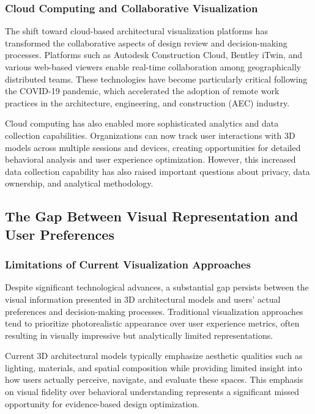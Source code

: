 \documentclass[12pt,a4paper]{book}
\begin{document}
\subsubsection{Cloud Computing and Collaborative Visualization}
\label{subsubsec:cloud_collaborative}

The shift toward cloud-based architectural visualization platforms has transformed the collaborative aspects of design review and decision-making processes. Platforms such as Autodesk Construction Cloud, Bentley iTwin, and various web-based viewers enable real-time collaboration among geographically distributed teams. These technologies have become particularly critical following the COVID-19 pandemic, which accelerated the adoption of remote work practices in the architecture, engineering, and construction (AEC) industry.

Cloud computing has also enabled more sophisticated analytics and data collection capabilities. Organizations can now track user interactions with 3D models across multiple sessions and devices, creating opportunities for detailed behavioral analysis and user experience optimization. However, this increased data collection capability has also raised important questions about privacy, data ownership, and analytical methodology.

\subsection{The Gap Between Visual Representation and User Preferences}
\label{subsec:gap_visual_preferences}

\subsubsection{Limitations of Current Visualization Approaches}
\label{subsubsec:visualization_limitations}

Despite significant technological advances, a substantial gap persists between the visual information presented in 3D architectural models and users' actual preferences and decision-making processes. Traditional visualization approaches tend to prioritize photorealistic appearance over user experience metrics, often resulting in visually impressive but analytically limited representations.

Current 3D architectural models typically emphasize aesthetic qualities such as lighting, materials, and spatial composition while providing limited insight into how users actually perceive, navigate, and evaluate these spaces. This emphasis on visual fidelity over behavioral understanding represents a significant missed opportunity for evidence-based design optimization.
\end{document}
